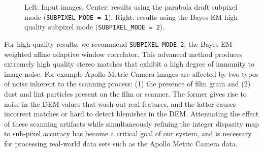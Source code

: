 \begin{figure}[tb]

\caption{Left: Input images.  Center: results using the parabola draft
  subpixel mode (\texttt{SUBPIXEL\_MODE = 1}). Right: results using the Bayes
  EM high quality subpixel mode (\texttt{SUBPIXEL\_MODE = 2}).}
\label{fig:parabola_results}
\end{figure}

For high quality results, we recommend \texttt{SUBPIXEL\_MODE 2}:
the Bayes EM weighted affine adaptive window correlator.  This
advanced method produces extremely high quality stereo matches that
exhibit a high degree of immunity to image noise.  For example
Apollo Metric Camera images are affected by two types of noise
inherent to the scanning process: (1) the presence of film grain
and (2) dust and lint particles present on the film or scanner.
The former gives rise to noise in the \ac{DEM} values that wash out real
features, and the latter causes incorrect matches or hard to detect
blemishes in the \ac{DEM}.  Attenuating the effect of these scanning
artifacts while simultaneously refining the integer disparity map
to sub-pixel accuracy has become a critical goal of our system, and
is necessary for processing real-world data sets such as the Apollo
Metric Camera data.

